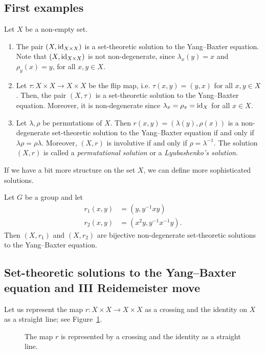 \subsection{First examples}
    \begin{examples}
        Let $X$ be a non-empty set.  
        \begin{enumerate}
            \item The pair $(X,\operatorname{id}_{X\times X})$ is a  set-theoretic solution to the  Yang--Baxter equation. Note that $(X,\operatorname{id}_{X\times X})$ is not non-degenerate, since $\lambda_x(y)=x$ and $\rho_y(x)=y$, for all $x,y\in X$.
            \item Let $\tau: X \times X \to X \times X$ be the flip map, i.e. $\tau(x,y)=(y,x)$ for all $x,y \in X$. Then, the pair $(X,\tau)$ is a set-theoretic solution to the Yang--Baxter equation. Moreover, it is non-degenerate since $\lambda_x=\rho_x=\operatorname{id}_X$ for all $x\in X$.
            \item Let $\lambda, \rho$ be permutations of $X$. Then $r(x,y)=(\lambda(y),\rho(x))$ is a
            non-degenerate set-theoretic solution to the Yang--Baxter equation if and only if $\lambda\rho = \rho\lambda$.
            Moreover, $(X , r )$ is involutive if and only if $\rho = \lambda^{-1}$. The solution 
            $(X,r)$ is called a \emph{permutational solution} or a \emph{Lyubashenko's solution}.
        \end{enumerate}
    \end{examples}

    If we have a bit more structure on the set $X$, we can define more sophisticated solutions.
    \begin{example}
        Let $G$ be a group and let
        \begin{align*}
            r_1(x,y) &= (y, y^{-1}xy)\\
            r_2(x,y) &= (x^{2}y, y^{-1}x^{-1}y).
        \end{align*}
        Then $(X,r_1)$ and $(X,r_2)$ are bijective non-degenerate set-theoretic solutions to the Yang--Baxter equation.
    \end{example}

\subsection{Set-theoretic solutions to the Yang--Baxter equation and III Reidemeister move}
    Let us represent the map $r:X \times X \to X \times X$ as a crossing and the identity on $X$ as a straight line; see Figure~\ref{fig:crossing}. 
    \begin{figure}[h!]
        \centering
        \caption{The map $r$ is represented by a crossing and the identity as a straight line.}
        \label{fig:crossing}
    \end{figure}

